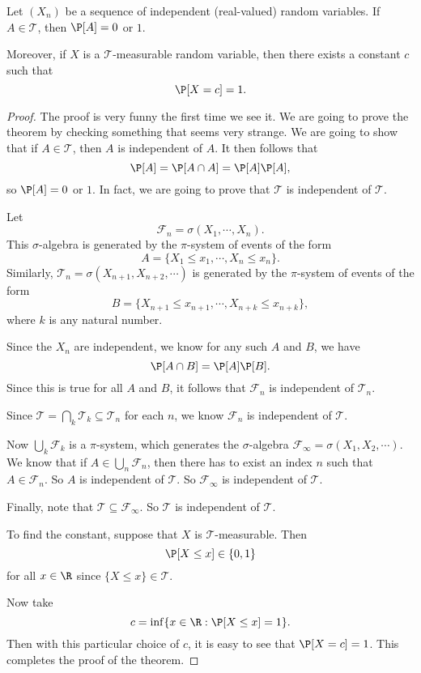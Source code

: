 \documentclass[a4paper]{article}
\begin{document}
\begin{thm}
  Let $(X_n)$ be a sequence of independent (real-valued) random variables. If $A \in \mathcal{T}$, then $\P[A] = 0$ or $1$.

  Moreover, if $X$ is a $\mathcal{T}$-measurable random variable, then there exists a constant $c$ such that
  \[
    \P[X = c] = 1.
  \]
\end{thm}

\begin{proof}
  The proof is very funny the first time we see it. We are going to prove the theorem by checking something that seems very strange. We are going to show that if $A \in \mathcal{T}$, then $A$ is independent of $A$. It then follows that
  \[
    \P[A] = \P[A \cap A] = \P[A] \P[A],
  \]
  so $\P[A] = 0$ or $1$. In fact, we are going to prove that $\mathcal{T}$ is independent of $\mathcal{T}$.

  Let
  \[
    \mathcal{F}_n = \sigma(X_1, \cdots, X_n).
  \]
  This $\sigma$-algebra is generated by the $\pi$-system of events of the form
  \[
    A = \{X_1 \leq x_1, \cdots, X_n \leq x_n\}.
  \]
  Similarly, $\mathcal{T}_n = \sigma(X_{n + 1}, X_{n + 2}, \cdots)$ is generated by the $\pi$-system of events of the form
  \[
    B = \{X_{n + 1} \leq x_{n + 1}, \cdots, X_{n + k} \leq x_{n + k}\},
  \]
  where $k$ is any natural number.

  Since the $X_n$ are independent, we know for any such $A$ and $B$, we have
  \[
    \P[A \cap B] = \P[A]\P[B].
  \]
  Since this is true for all $A$ and $B$, it follows that $\mathcal{F}_n$ is independent of $\mathcal{T}_n$.

  Since $\mathcal{T} = \bigcap_k \mathcal{T}_k \subseteq \mathcal{T}_n$ for each $n$, we know $\mathcal{F}_n$ is independent of $\mathcal{T}$.

  Now $\bigcup_k \mathcal{F}_k$ is a $\pi$-system, which generates the $\sigma$-algebra $\mathcal{F}_\infty = \sigma(X_1, X_2, \cdots)$. We know that if $A \in \bigcup_n \mathcal{F}_n$, then there has to exist an index $n$ such that $A \in \mathcal{F}_n$. So $A$ is independent of $\mathcal{T}$. So $\mathcal{F}_\infty$ is independent of $\mathcal{T}$.

  Finally, note that $\mathcal{T} \subseteq \mathcal{F}_\infty$. So $\mathcal{T}$ is independent of $\mathcal{T}$.

  To find the constant, suppose that $X$ is $\mathcal{T}$-measurable. Then
  \[
    \P[X \leq x] \in \{0, 1\}
  \]
  for all $x \in \R$ since $\{X \leq x\} \in \mathcal{T}$.

  Now take
  \[
    c = \inf\{x \in \R: \P[X \leq x] = 1\}.
  \]
  Then with this particular choice of $c$, it is easy to see that $\P[X = c] = 1$. This completes the proof of the theorem.
\end{proof}
\end{document}
